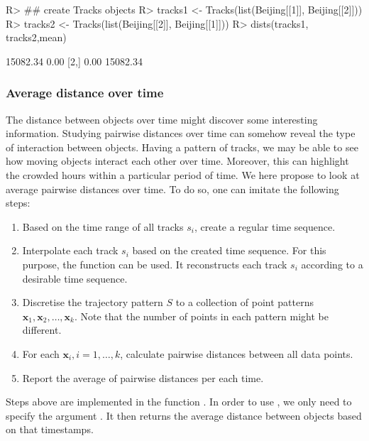 \documentclass[article]{jss}
\begin{document}
\begin{Sinput}
R> ## create Tracks objects
R> tracks1 <- Tracks(list(Beijing[[1]], Beijing[[2]]))
R> tracks2 <- Tracks(list(Beijing[[2]], Beijing[[1]]))
R> dists(tracks1, tracks2,mean)
\end{Sinput}
\begin{Soutput}
         [,1]     [,2]
[1,] 15082.34     0.00
[2,]     0.00 15082.34
\end{Soutput}

\subsubsection{Average distance over time}
  The distance between objects over time might discover some interesting information. Studying pairwise distances over time can somehow reveal the type of interaction between objects. Having a pattern of tracks, we may be able to see how moving objects interact each other over time. Moreover, this can highlight the crowded hours within a particular period of time. We here propose to look at average pairwise distances over time. To do so, one can imitate the following steps:
  \begin{leftbar}
  \begin{enumerate}
  \item Based on the time range of all tracks $s_i$, create a regular time sequence.
  \item Interpolate each track $s_i$ based on the created time sequence. For this purpose, the function  can be used. It reconstructs each track $s_i$ according to a desirable time sequence.
  \item Discretise the trajectory pattern $S$ to a collection of point patterns $\mathbf{x}_1,\mathbf{x}_2, \ldots, \mathbf{x}_k$. Note that the number of points in each pattern might be different.
  \item For each $\mathbf{x}_i ,i=1,\ldots,k$, calculate pairwise distances between all data points.
  \item Report the average of pairwise distances per each time.
  \end{enumerate}
  \end{leftbar}
  Steps above are implemented in the function . In order to use , we only need to specify the argument . It then returns the average distance between objects based on that timestamps. 
\end{document}
